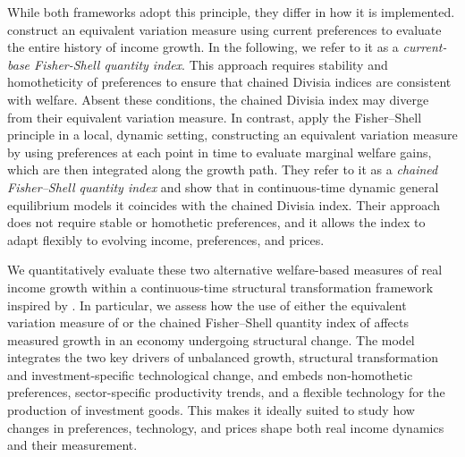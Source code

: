 \documentclass[12pt,a4paper]{article}
\begin{document}
While both frameworks adopt this principle, they differ in how it is implemented. \citet{BB2023welfare} construct an equivalent variation measure using current preferences to evaluate the entire history of income growth. In the following, we refer to it as a {\it current-base Fisher-Shell quantity index}. 
This approach requires stability and homotheticity of preferences to ensure that chained Divisia indices are consistent with welfare. Absent these conditions, the chained Divisia index may diverge from their equivalent variation %
measure. In contrast, \citet{duran_licandro_2024} apply the Fisher–Shell principle in a local, dynamic setting, constructing an equivalent variation measure by using preferences at each point in time to evaluate marginal welfare gains, which are then integrated along the growth path.
They refer to it as a %
{\it chained Fisher–Shell quantity index} and show that in continuous-time dynamic general equilibrium models it coincides with the chained Divisia index. Their approach does not require stable or homothetic preferences, and it allows the index to adapt flexibly to evolving income, preferences, and prices.



We quantitatively evaluate these two alternative welfare-based measures of real income growth within a continuous-time structural transformation framework inspired by \citet{herrendorf_rogerson_valentinyi_2021}. In particular, we assess how the use of either the equivalent variation measure of \citet{BB2023welfare} or the chained Fisher–Shell quantity index of \citet{duran_licandro_2024} affects measured growth in an economy undergoing structural change. The model integrates the two key drivers of unbalanced growth, structural transformation and investment-specific technological change, and embeds non-homothetic preferences, sector-specific productivity trends, and a flexible technology for the production of investment goods. This makes it ideally suited to study how changes in preferences, technology, and prices shape both real income dynamics and their measurement.
\end{document}
